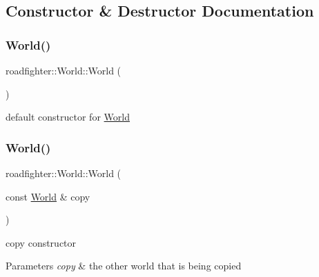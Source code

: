 \subsection{Constructor \& Destructor Documentation}
\mbox{\label{classroadfighter_1_1World_aa75df604422c5e2f160d082da86a50c4}} 
\subsubsection{\texorpdfstring{World()}{World()}\hspace{0.1cm}{\footnotesize\ttfamily [1/4]}}
{\footnotesize\ttfamily roadfighter\+::\+World\+::\+World (\begin{DoxyParamCaption}{ }\end{DoxyParamCaption})\hspace{0.3cm}{\ttfamily [default]}}

default constructor for \hyperlink{classroadfighter_1_1World}{World} \mbox{\label{classroadfighter_1_1World_aa2f34c06cc3b81a6cd3f862137f1786b}} 
\subsubsection{\texorpdfstring{World()}{World()}\hspace{0.1cm}{\footnotesize\ttfamily [2/4]}}
{\footnotesize\ttfamily roadfighter\+::\+World\+::\+World (\begin{DoxyParamCaption}\item[{const \hyperlink{classroadfighter_1_1World}{World} \&}]{copy }\end{DoxyParamCaption})\hspace{0.3cm}{\ttfamily [default]}}

copy constructor 
\begin{DoxyParams}{Parameters}
{\em copy} & the other world that is being copied \\
\hline
\end{DoxyParams}
\mbox{\label{classroadfighter_1_1World_aabd6663f3ee5533809152f154064cd89}} 
